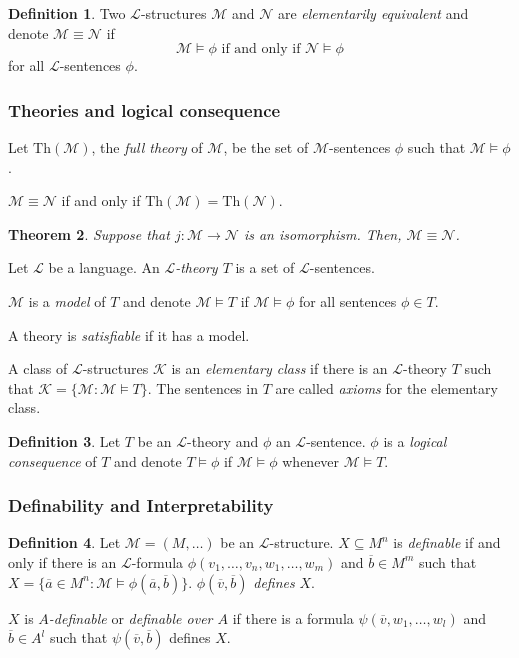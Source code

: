\documentclass{amsart}
\newtheorem{theorem}{Theorem}[subsection]
\theoremstyle{definition}
\newtheorem{definition}[theorem]{Definition}
\numberwithin{equation}{section}
\begin{document}
\begin{definition}
	Two $\mathcal{L}$-structures $\mathcal{M}$ and $\mathcal{N}$ are \emph{elementarily equivalent}
	and denote $\mathcal{M} \equiv \mathcal{N}$ if
	\[
		\mathcal{M} \models \phi \text{ if and only if }\mathcal{N} \models \phi
	\]
	for all $\mathcal{L}$-sentences $\phi$.
\end{definition}

\subsubsection{Theories and logical consequence}
Let $\mathrm{Th}(\mathcal{M})$, the \emph{full theory} of $\mathcal{M}$,
be the set of $\mathcal{M}$-sentences $\phi$ such that $\mathcal{M} \models \phi$.

$\mathcal{M} \equiv \mathcal{N}$ if and only if $\mathrm{Th}(\mathcal{M}) = \mathrm{Th}(\mathcal{N})$.

\begin{theorem}
	Suppose that $j: \mathcal{M} \to \mathcal{N}$ is an isomorphism.
	Then, $\mathcal{M} \equiv \mathcal{N}$.
\end{theorem}

Let $\mathcal{L}$ be a language.
An \emph{$\mathcal{L}$-theory $T$} is a set of $\mathcal{L}$-sentences.

$\mathcal{M}$ is a \emph{model} of $T$ and denote $\mathcal{M} \models T$ if $\mathcal{M} \models \phi$ for all sentences $\phi \in T$.

A theory is \emph{satisfiable} if it has a model.

A class of $\mathcal{L}$-structures $\mathcal{K}$ is an \emph{elementary class}
if there is an $\mathcal{L}$-theory $T$ such that $\mathcal{K} = \{ \mathcal{M}:\mathcal{M} \models T \}$.
The sentences in $T$ are called \emph{axioms} for the elementary class.

\begin{definition}
	Let $T$ be an $\mathcal{L}$-theory and $\phi$ an $\mathcal{L}$-sentence.
	$\phi$ is a \emph{logical consequence} of $T$ and denote $T \models \phi$ if $\mathcal{M} \models \phi$
	whenever $\mathcal{M} \models T$.
\end{definition}

\subsubsection{Definability and Interpretability}
\begin{definition}
	Let $\mathcal{M} = (M,\dots)$ be an $\mathcal{L}$-structure.
	$X \subseteq M^n$ is \emph{definable} if and only if there is an $\mathcal{L}$-formula $\phi(v_1,\dots,v_n,w_1,\dots,w_m)$
	and $\overline{b} \in M^m$ such that $X = \{ \overline{a} \in M^n : \mathcal{M} \models \phi(\overline{a},\overline{b}) \}$.
	$\phi(\overline{v},\overline{b})$ \emph{defines} $X$.

	$X$ is \emph{$A$-definable }or \emph{definable over $A$} if there is a formula $\psi(\overline{v},w_1,\dots,w_l)$ and
	$\overline{b} \in A^l$ such that $\psi(\overline{v},\overline{b})$ defines $X$.
\end{definition}
\end{document}
